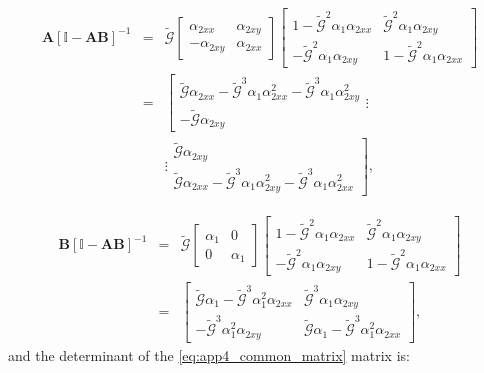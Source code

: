 \begin{eqnarray}
\mathbf{A}\left[\mathbb{I}-\mathbf{A}\mathbf{B}\right]^{-1} & = & \tilde{\mathcal{G}}\begin{bmatrix}\alpha_{2xx} & \alpha_{2xy}\\
-\alpha_{2xy} & \alpha_{2xx}
\end{bmatrix}\begin{bmatrix}1-\tilde{\mathcal{G}}^{2}\alpha_{1}\alpha_{2xx} & \tilde{\mathcal{G}}^{2}\alpha_{1}\alpha_{2xy}  \\
-\tilde{\mathcal{G}}^{2}\alpha_{1}\alpha_{2xy} & 1-\tilde{\mathcal{G}}^{2}\alpha_{1}\alpha_{2xx}
\end{bmatrix} \nonumber\\
& = & \left[\begin{array}{c}
\tilde{\mathcal{G}}\alpha_{2xx}-\tilde{\mathcal{G}}^{3}\alpha_{1}\alpha_{2xx}^{2}-\tilde{\mathcal{G}}^{3}\alpha_{1}\alpha_{2xy}^{2}\\
-\tilde{\mathcal{G}}\alpha_{2xy}
\end{array}\right.\vdots \nonumber\\
& &\vdots\left.\begin{array}{c}
\tilde{\mathcal{G}}\alpha_{2xy}\\
\tilde{\mathcal{G}}\alpha_{2xx}-\tilde{\mathcal{G}}^{3}\alpha_{1}\alpha_{2xy}^{2}-\tilde{\mathcal{G}}^{3}\alpha_{1}\alpha_{2xx}^{2}
\end{array}\right],
\end{eqnarray}

\begin{eqnarray}
\mathbf{B}\left[\mathbb{I}-\mathbf{A}\mathbf{B}\right]^{-1} & = & \tilde{\mathcal{G}}\begin{bmatrix}\alpha_{1} & 0\\
0 & \alpha_{1}
\end{bmatrix}\begin{bmatrix}1-\tilde{\mathcal{G}}^{2}\alpha_{1}\alpha_{2xx} & \tilde{\mathcal{G}}^{2}\alpha_{1}\alpha_{2xy}\\
-\tilde{\mathcal{G}}^{2}\alpha_{1}\alpha_{2xy} & 1-\tilde{\mathcal{G}}^{2}\alpha_{1}\alpha_{2xx}
\end{bmatrix}\\
 & = & \begin{bmatrix}\tilde{\mathcal{G}}\alpha_{1}-\tilde{\mathcal{G}}^{3}\alpha_{1}^{2}\alpha_{2xx} & \tilde{\mathcal{G}}^{3}\alpha_{1}\alpha_{2xy}\\
-\tilde{\mathcal{G}}^{3}\alpha_{1}^{2}\alpha_{2xy} & \tilde{\mathcal{G}}\alpha_{1}-\tilde{\mathcal{G}}^{3}\alpha_{1}^{2}\alpha_{2xx}
\end{bmatrix},
\end{eqnarray}
and the determinant of the \ref{eq:app4_common_matrix} matrix is:

